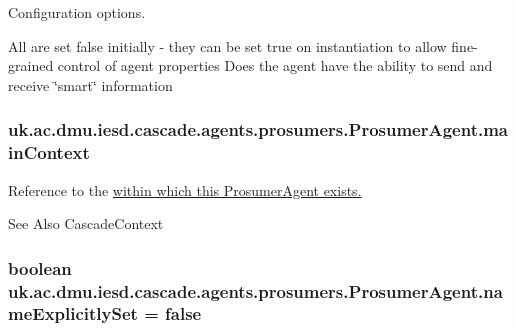 Configuration options. 

All are set false initially -\/ they can be set true on instantiation to allow fine-\/grained control of agent properties Does the agent have the ability to send and receive \char`\"{}smart\char`\"{} information \hypertarget{classuk_1_1ac_1_1dmu_1_1iesd_1_1cascade_1_1agents_1_1prosumers_1_1_prosumer_agent_a237dcff035ef786226e3843e8021761a}{
\subsubsection[{main\-Context}]{ uk.\-ac.\-dmu.\-iesd.\-cascade.\-agents.\-prosumers.\-Prosumer\-Agent.\-main\-Context\hspace{0.3cm}{\ttfamily [protected]}}}\label{classuk_1_1ac_1_1dmu_1_1iesd_1_1cascade_1_1agents_1_1prosumers_1_1_prosumer_agent_a237dcff035ef786226e3843e8021761a}


Reference to the \hyperlink{}{within which this Prosumer\-Agent exists. }

\begin{DoxySeeAlso}{See Also}
Cascade\-Context 
\end{DoxySeeAlso}
\hypertarget{classuk_1_1ac_1_1dmu_1_1iesd_1_1cascade_1_1agents_1_1prosumers_1_1_prosumer_agent_ab01e8cf16e8d2b4c12e5cca9efd840c1}{
\subsubsection[{name\-Explicitly\-Set}]{\setlength{\rightskip}{0pt plus 5cm}boolean uk.\-ac.\-dmu.\-iesd.\-cascade.\-agents.\-prosumers.\-Prosumer\-Agent.\-name\-Explicitly\-Set = false\hspace{0.3cm}{\ttfamily [protected]}}}\label{classuk_1_1ac_1_1dmu_1_1iesd_1_1cascade_1_1agents_1_1prosumers_1_1_prosumer_agent_ab01e8cf16e8d2b4c12e5cca9efd840c1}



